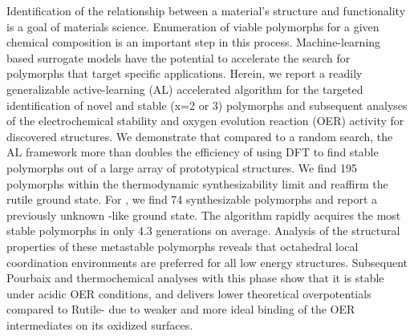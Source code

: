 %


%
Identification of the relationship between a material's structure and functionality is a goal of materials science.
Enumeration of viable polymorphs for a given chemical composition is an important step in this process.
%
Machine-learning based surrogate models have the potential to accelerate the search for polymorphs that target specific applications.
%
Herein, we report a readily generalizable active-learning (AL) accelerated algorithm for the targeted identification of novel and stable \IrOx (x=2 or 3) polymorphs and subsequent analyses of the electrochemical stability and oxygen evolution reaction (OER) activity for discovered structures.
%
We demonstrate that compared to a random search,
the AL framework more than doubles the efficiency of using DFT to find stable polymorphs out of a large array of prototypical structures.
%
We find  \num{195} \IrOtwo polymorphs within the thermodynamic synthesizability limit and reaffirm the rutile ground state.
%
For \IrOthree, we find \num{74} synthesizable polymorphs and report a previously unknown -like ground state.
%
The algorithm rapidly acquires the most stable polymorphs in only \num{4.3} generations on average. %
%
Analysis of the structural properties of these metastable polymorphs reveals that octahedral local coordination environments are preferred for all low energy structures.
%
Subsequent Pourbaix and thermochemical analyses with this \aIrOthree phase show that it is stable under acidic OER conditions,
and delivers lower theoretical overpotentials compared to Rutile- due to weaker and more ideal binding of the OER intermediates on its oxidized surfaces.





